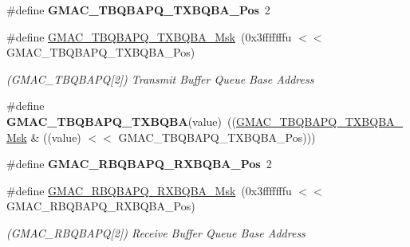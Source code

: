 \begin{DoxyCompactItemize}
\mbox{\label{group__SAMV71__GMAC_gaa195401304cd9450884fd72974e33e2f}} 
\#define {\bfseries G\+M\+A\+C\+\_\+\+T\+B\+Q\+B\+A\+P\+Q\+\_\+\+T\+X\+B\+Q\+B\+A\+\_\+\+Pos}~2
\item 
\mbox{\label{group__SAMV71__GMAC_ga936cd2f46a6cb1f85d3d4582fcb93e83}} 
\#define \mbox{\hyperlink{group__SAMV71__GMAC_ga936cd2f46a6cb1f85d3d4582fcb93e83}{G\+M\+A\+C\+\_\+\+T\+B\+Q\+B\+A\+P\+Q\+\_\+\+T\+X\+B\+Q\+B\+A\+\_\+\+Msk}}~(0x3fffffffu $<$$<$ G\+M\+A\+C\+\_\+\+T\+B\+Q\+B\+A\+P\+Q\+\_\+\+T\+X\+B\+Q\+B\+A\+\_\+\+Pos)
\begin{DoxyCompactList}\small\item\em (G\+M\+A\+C\+\_\+\+T\+B\+Q\+B\+A\+PQ\mbox{[}2\mbox{]}) Transmit Buffer Queue Base Address \end{DoxyCompactList}\item 
\mbox{\label{group__SAMV71__GMAC_gae3d06d6d20a6ddc2bb35443c8d3a30b5}} 
\#define {\bfseries G\+M\+A\+C\+\_\+\+T\+B\+Q\+B\+A\+P\+Q\+\_\+\+T\+X\+B\+Q\+BA}(value)~((\mbox{\hyperlink{group__SAMV71__GMAC_ga936cd2f46a6cb1f85d3d4582fcb93e83}{G\+M\+A\+C\+\_\+\+T\+B\+Q\+B\+A\+P\+Q\+\_\+\+T\+X\+B\+Q\+B\+A\+\_\+\+Msk}} \& ((value) $<$$<$ G\+M\+A\+C\+\_\+\+T\+B\+Q\+B\+A\+P\+Q\+\_\+\+T\+X\+B\+Q\+B\+A\+\_\+\+Pos)))
\item 
\mbox{\label{group__SAMV71__GMAC_ga9c982f9ffb7b0079d1febe1bfcf3a261}} 
\#define {\bfseries G\+M\+A\+C\+\_\+\+R\+B\+Q\+B\+A\+P\+Q\+\_\+\+R\+X\+B\+Q\+B\+A\+\_\+\+Pos}~2
\item 
\mbox{\label{group__SAMV71__GMAC_gaefda0915b8771d7a034d9a973cfbbdff}} 
\#define \mbox{\hyperlink{group__SAMV71__GMAC_gaefda0915b8771d7a034d9a973cfbbdff}{G\+M\+A\+C\+\_\+\+R\+B\+Q\+B\+A\+P\+Q\+\_\+\+R\+X\+B\+Q\+B\+A\+\_\+\+Msk}}~(0x3fffffffu $<$$<$ G\+M\+A\+C\+\_\+\+R\+B\+Q\+B\+A\+P\+Q\+\_\+\+R\+X\+B\+Q\+B\+A\+\_\+\+Pos)
\begin{DoxyCompactList}\small\item\em (G\+M\+A\+C\+\_\+\+R\+B\+Q\+B\+A\+PQ\mbox{[}2\mbox{]}) Receive Buffer Queue Base Address \end{DoxyCompactList}\item 
\mbox{\label{group__SAMV71__GMAC_gae0f95359b25ee5113b25e2c389fcb301}} 
$$
\end{DoxyCompactItemize}
